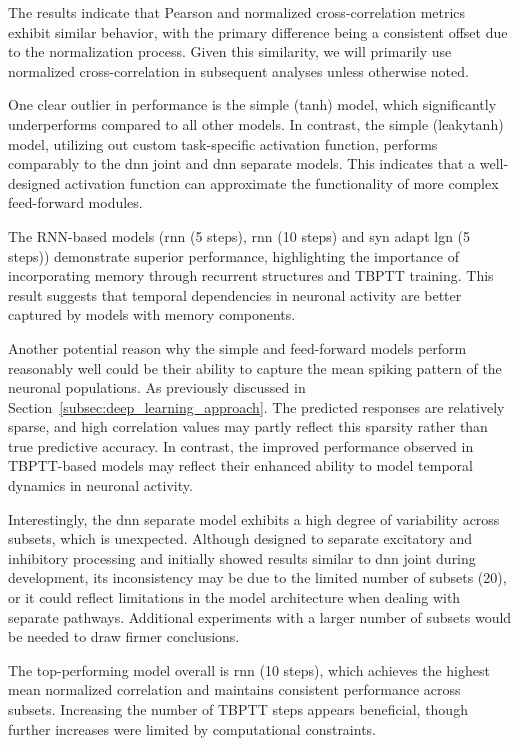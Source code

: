 The results indicate that Pearson and normalized cross-correlation metrics exhibit similar behavior, with the primary difference being a consistent offset due to the normalization process. Given this similarity, we will primarily use normalized cross-correlation in subsequent analyses unless otherwise noted.

One clear outlier in performance is the simple (tanh) model, which significantly underperforms compared to all other models. In contrast, the simple (leakytanh) model, utilizing out custom task-specific activation function, performs comparably to the dnn joint and dnn separate models. This indicates that a well-designed activation function can approximate the functionality of more complex feed-forward modules.

The RNN-based models (rnn (5 steps), rnn (10 steps) and syn adapt lgn (5 steps)) demonstrate superior performance, highlighting the importance of incorporating memory through recurrent structures and TBPTT training. This result suggests that temporal dependencies in neuronal activity are better captured by models with memory components.

Another potential reason why the simple and feed-forward models perform reasonably well could be their ability to capture the mean spiking pattern of the neuronal populations. As previously discussed in Section~\ref{subsec:deep_learning_approach}. The predicted responses are relatively sparse, and high correlation values may partly reflect this sparsity rather than true predictive accuracy. In contrast, the improved performance observed in TBPTT-based models may reflect their enhanced ability to model temporal dynamics in neuronal activity.

Interestingly, the dnn separate model exhibits a high degree of variability across subsets, which is unexpected. Although designed to separate excitatory and inhibitory processing and initially showed results similar to dnn joint during development, its inconsistency may be due to the limited number of subsets (20), or it could reflect limitations in the model architecture when dealing with separate pathways. Additional experiments with a larger number of subsets would be needed to draw firmer conclusions.

The top-performing model overall is rnn (10 steps), which achieves the highest mean normalized correlation and maintains consistent performance across subsets. Increasing the number of TBPTT steps appears beneficial, though further increases were limited by computational constraints.

